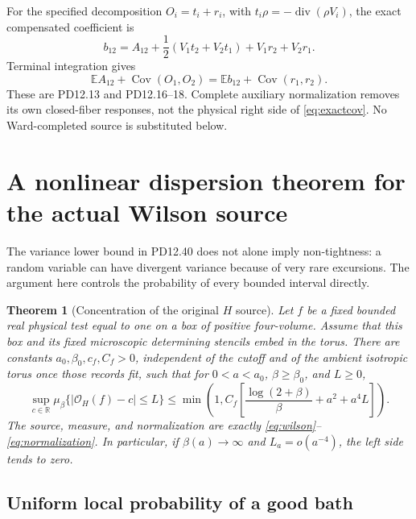 \documentclass[11pt,letterpaper]{article}
\numberwithin{equation}{section}
\theoremstyle{plain}
\newtheorem{theorem}{Theorem}[section]
\theoremstyle{remark}
\DeclareMathOperator{\Cov}{Cov}
\DeclareMathOperator{\diver}{div}
\newcommand{\E}{\mathbb E}
\newcommand{\R}{\mathbb R}
\newcommand{\abs}[1]{\left|#1\right|}
\newcommand{\OH}{\mathcal O_H}
\begin{document}
For the specified decomposition $O_i=t_i+r_i$, with
$t_i\rho=-\diver(\rho V_i)$, the exact compensated coefficient is
\begin{equation}
 b_{12}=A_{12}+\frac12(V_1t_2+V_2t_1)+V_1r_2+V_2r_1.
 \label{eq:b12}
\end{equation}
Terminal integration gives
\begin{equation}
 \E A_{12}+\Cov(O_1,O_2)=\E b_{12}+\Cov(r_1,r_2).
 \label{eq:exactcov}
\end{equation}
These are PD12.13 and PD12.16--18. Complete auxiliary normalization removes its
own closed-fiber responses, not the physical right side of
\eqref{eq:exactcov}. No Ward-completed source is substituted below.

\section{A nonlinear dispersion theorem for the actual Wilson source}
\label{sec:dispersion}

The variance lower bound in PD12.40 does not alone imply non-tightness: a random
variable can have divergent variance because of very rare excursions. The argument
here controls the probability of every bounded interval directly.

\begin{theorem}[Concentration of the original $H$ source]
\label{thm:concentration}
Let $f$ be a fixed bounded real physical test equal to one on a box of positive
four-volume. Assume that this box and its fixed microscopic determining stencils
embed in the torus. There are constants $a_0,\beta_0,c_f,C_f>0$, independent of the
cutoff and of the ambient isotropic torus once those records fit, such that for
$0<a<a_0$, $\beta\ge\beta_0$, and $L\ge0$,
\begin{equation}
 \sup_{c\in\R}\mu_\beta\{\abs{\OH(f)-c}\le L\}
 \le \min\left(1,C_f\left[
          \frac{\log(2+\beta)}{\beta}+a^2+a^4L\right]\right).
 \label{eq:AC}
\end{equation}
The source, measure, and normalization are exactly
\eqref{eq:wilson}--\eqref{eq:normalization}. In particular, if
$\beta(a)\to\infty$ and $L_a=o(a^{-4})$, the left side tends to zero.
\end{theorem}

\subsection{Uniform local probability of a good bath}
\end{document}
